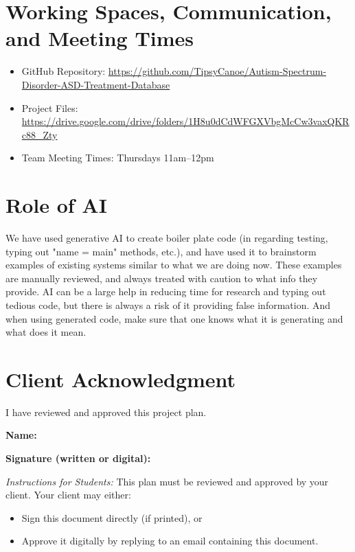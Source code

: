 \documentclass{article}
\begin{document}
\section*{Working Spaces, Communication, and Meeting Times}
\begin{itemize}
    \item GitHub Repository: \url{https://github.com/TipsyCanoe/Autism-Spectrum-Disorder-ASD-Treatment-Database}
    \item Project Files: \url{https://drive.google.com/drive/folders/1H8u0dCdWFGXVbgMcCw3vaxQKRc88_Zty}

    \item Team Meeting Times: Thursdays 11am--12pm

\end{itemize}

\section*{Role of AI}
We have used generative AI to create boiler plate code (in regarding testing, typing out "name = main" methods, etc.), and have used it to brainstorm examples of existing systems similar to what we are doing now. These examples are manually reviewed, and always treated with caution to what info they provide. AI can be a large help in reducing time for research and typing out tedious code, but there is always a risk of it providing false information. And when using generated code, make sure that one knows what it is generating and what does it mean.

\section*{Client Acknowledgment}
I have reviewed and approved this project plan.  

\vspace{1em}
\noindent\textbf{Name:} \underline{\hspace{7cm}}  

\vspace{1em}
\noindent\textbf{Signature (written or digital):} \underline{\hspace{7cm}}  

\vspace{2em}
\noindent\textit{Instructions for Students:}  
This plan must be reviewed and approved by your client.  
Your client may either:  
\begin{itemize}
    \item Sign this document directly (if printed), or  
    \item Approve it digitally by replying to an email containing this document.  
\end{itemize}
\end{document}
